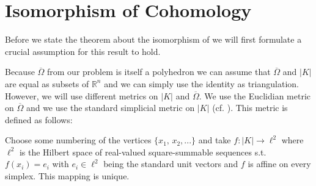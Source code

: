 \documentclass[12pt,a4paper]{article}
\theoremstyle{definition}
\newcommand{\omegabar}{\overline{\Omega}}
\newcommand{\real}{\mathbb{R}}
\begin{document}
\section{Isomorphism of Cohomology}


Before we state the theorem about the isomorphism of we will first formulate 
a crucial assumption for this result to hold.


Because $\omegabar$ from our problem is itself a polyhedron we can
assume that $\omegabar$ and $|K|$ are equal as subsets of $\real^n$ and we can
simply use the identity as triangulation.
However, we will use different metrics on $|K|$ and $\omegabar$. 
We use the Euclidian metric on 
$\omegabar$ and we use the standard simplicial metric on $|K|$ (cf. 
\cite[p.191]{goldshtein}). This metric is defined as follows:

Choose some numbering of the vertices $\{ x_1,\, x_2, ... \}$ and
take $f: |K| \rightarrow \ell^2$ where $\ell^2$ is the 
Hilbert space of real-valued square-summable sequences s.t. $f(x_i) = e_i$ 
with $e_i \in \ell^2$ being the standard unit vectors and $f$ is affine on 
every simplex. This mapping is unique.%
\end{document}
